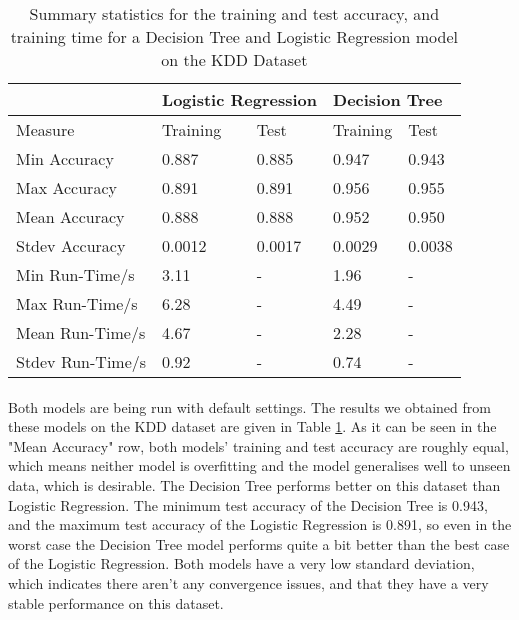 \documentclass[12pt, letterpaper]{article}
\begin{document}
\begin{table}[h]
\centering
\caption{Summary statistics for the training and test accuracy, and training time for a Decision Tree and Logistic Regression model on the KDD Dataset}
\label{results table}
\begin{tabular}{|l|ll|ll|}
\hline
               & \multicolumn{2}{l|}{Logistic Regression}                     & \multicolumn{2}{l|}{Decision Tree}    \\ \hline
Measure        & \multicolumn{1}{l|}{Training}           & Test               & \multicolumn{1}{l|}{Training} & Test  \\ \hline
Min Accuracy   & \multicolumn{1}{l|}{0.887} & 0.885 & \multicolumn{1}{l|}{0.947}    & 0.943 \\ \hline
Max Accuracy   & \multicolumn{1}{l|}{0.891} & 0.891 & \multicolumn{1}{l|}{0.956}    & 0.955 \\ \hline
Mean Accuracy  & \multicolumn{1}{l|}{0.888} & 0.888 & \multicolumn{1}{l|}{0.952}    & 0.950 \\ \hline
Stdev Accuracy & \multicolumn{1}{l|}{0.0012} & 0.0017 & \multicolumn{1}{l|}{0.0029} & 0.0038 \\ \hline
Min Run-Time/s   & \multicolumn{1}{l|}{3.11}  & -                & \multicolumn{1}{l|}{1.96}     & -   \\ \hline
Max Run-Time/s   & \multicolumn{1}{l|}{6.28} & -                & \multicolumn{1}{l|}{4.49}     & -   \\ \hline
Mean Run-Time/s  & \multicolumn{1}{l|}{4.67}   & -                & \multicolumn{1}{l|}{2.28}     & -   \\ \hline
Stdev Run-Time/s & \multicolumn{1}{l|}{0.92} & -                & \multicolumn{1}{l|}{0.74}     & -   \\ \hline
\end{tabular}
\end{table}

\paragraph{}
Both models are being run with default settings. The results we obtained from these models on the KDD dataset are given in Table \ref{results table}. As it can be seen in the "Mean Accuracy" row, both models' training and test accuracy are roughly equal, which means neither model is overfitting and the model generalises well to unseen data, which is desirable. The Decision Tree performs better on this dataset than Logistic Regression. The minimum test accuracy of the Decision Tree is 0.943, and the maximum test accuracy of the Logistic Regression is 0.891, so even in the worst case the Decision Tree model performs quite a bit better than the best case of the Logistic Regression. Both models have a very low standard deviation, which indicates there aren't any convergence issues, and that they have a very stable performance on this dataset. 
\end{document}
